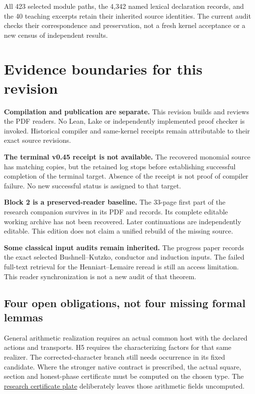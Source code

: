 All 423 selected module paths, the 4,342 named lexical declaration records, and the 40 teaching excerpts retain their inherited source identities. The current audit checks their correspondence and preservation, not a fresh kernel acceptance or a new census of independent results.
\clearpage
\section*{Evidence boundaries for this revision}
{}
\textbf{Compilation and publication are separate.} This revision builds and reviews the PDF readers. No Lean, Lake or independently implemented proof checker is invoked. Historical compiler and same-kernel receipts remain attributable to their exact source revisions.

\textbf{The terminal v0.45 receipt is not available.} The recovered monomial source has matching copies, but the retained log stops before establishing successful completion of the terminal target. Absence of the receipt is not proof of compiler failure. No new successful status is assigned to that target.

\textbf{Block 2 is a preserved-reader baseline.} The 33-page first part of the research companion survives in its PDF and records. Its complete editable working archive has not been recovered. Later continuations are independently editable. This edition does not claim a unified rebuild of the missing source.

\textbf{Some classical input audits remain inherited.} The progress paper records the exact selected Bushnell--Kutzko, conductor and induction inputs. The failed full-text retrieval for the Henniart--Lemaire reread is still an access limitation. This reader synchronization is not a new audit of that theorem.

\subsection*{Four open obligations, not four missing formal lemmas}
General arithmetic realization requires an actual common host with the declared actions and transports. H5 requires the characterizing factors for that same realizer. The corrected-character branch still needs occurrence in its fixed candidate. Where the stronger native contract is prescribed, the actual square, section and honest-phase certificate must be computed on the chosen type. The \href{https://komorebi.invalid/b06/lean_native}{research certificate plate} deliberately leaves those arithmetic fields uncomputed.


